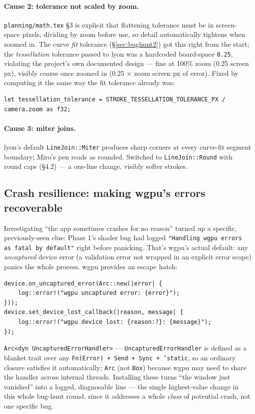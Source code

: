 \documentclass[11pt]{article}
\begin{document}
\paragraph{Cause 2: tolerance not scaled by zoom.} \texttt{planning/math.tex} \S3 is
explicit that flattening tolerance must be in screen-space pixels, dividing by zoom before
use, so detail automatically tightens when zoomed in. The curve \emph{fit} tolerance
(\S\ref{sec:bughunt2}) got this right from the start; the \emph{tessellation} tolerance
passed to lyon was a hardcoded board-space \texttt{0.25}, violating the project's own
documented design — fine at 100\% zoom (0.25 screen px), visibly coarse once zoomed in
(0.25 $\times$ zoom screen px of error). Fixed by computing it the same way the fit
tolerance already was:
\begin{lstlisting}
let tessellation_tolerance = STROKE_TESSELLATION_TOLERANCE_PX / camera.zoom as f32;
\end{lstlisting}

\paragraph{Cause 3: miter joins.} lyon's default \texttt{LineJoin::Miter} produces sharp
corners at every curve-fit segment boundary; Miro's pen reads as rounded. Switched to
\texttt{LineJoin::Round} with round caps (\S4.2) — a one-line change, visibly softer
strokes.

\subsection{Crash resilience: making wgpu's errors recoverable}
\label{sec:crashes}
Investigating ``the app sometimes crashes for no reason'' turned up a specific,
previously-seen clue: Phase 1's shader bug had logged
\texttt{"Handling wgpu errors as fatal by default"} right before panicking. That's wgpu's
actual default: any \emph{uncaptured} device error (a validation error not wrapped in an
explicit error scope) panics the whole process. wgpu provides an escape hatch:
\begin{lstlisting}
device.on_uncaptured_error(Arc::new(|error| {
    log::error!("wgpu uncaptured error: {error}");
}));
device.set_device_lost_callback(|reason, message| {
    log::error!("wgpu device lost: {reason:?}: {message}");
});
\end{lstlisting}
\texttt{Arc<dyn UncapturedErrorHandler>} — \texttt{UncapturedErrorHandler} is defined as a
blanket trait over any \texttt{Fn(Error) + Send + Sync + 'static}, so an ordinary closure
satisfies it automatically; \texttt{Arc} (not \texttt{Box}) because wgpu may need to share
the handler across internal threads. Installing these turns ``the window just vanished''
into a logged, diagnosable line — the single highest-value change in this whole bug-hunt
round, since it addresses a whole \emph{class} of potential crash, not one specific bug.
\end{document}
